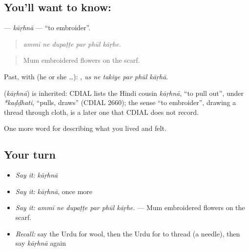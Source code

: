 \subsection*{You'll want to know: }
\textbf{} — \emph{kāṛhnā} — \textquotedblleft{}to embroider\textquotedblright{}.

\begin{quote}
     
\end{quote}

\begin{quote}
\emph{ammī ne dupaṭṭe par phūl kāṛhe.}
\end{quote}

\begin{quote}
Mum embroidered flowers on the scarf.
\end{quote}

Past, with  (he or she …):      , \emph{us ne takiye par phūl kāṛhā}.

\begin{cousinweb}
\textbf{} (\emph{kāṛhnā}) is inherited: CDIAL lists the Hindi cousin \emph{kāṛhnā}, \textquotedblleft{}to pull out\textquotedblright{}, under \emph{*kaḍḍhati}, \textquotedblleft{}pulls, draws\textquotedblright{} (CDIAL 2660); the sense \textquotedblleft{}to embroider\textquotedblright{}, drawing a thread through cloth, is a later one that CDIAL does not record.
\end{cousinweb}

\begin{grammarlens}[title={What you've built}]
One more word for describing what you lived and felt.
\end{grammarlens}

\subsection*{Your turn}
\begin{itemize}
\raggedright
  \item \emph{Say it:} \emph{kāṛhnā}
  \item \emph{Say it:} \emph{kāṛhnā}, once more
  \item \emph{Say it:} \emph{ammī ne dupaṭṭe par phūl kāṛhe.} — Mum embroidered flowers on the scarf.
  \item \emph{Recall:} say the Urdu for wool, then the Urdu for to thread (a needle), then say \emph{kāṛhnā} again
\end{itemize}

